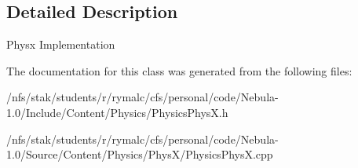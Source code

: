 \subsection{Detailed Description}
Physx Implementation 

The documentation for this class was generated from the following files:\begin{DoxyCompactItemize}
\item 
/nfs/stak/students/r/rymalc/cfs/personal/code/Nebula-\/1.0/Include/Content/Physics/PhysicsPhysX.h\item 
/nfs/stak/students/r/rymalc/cfs/personal/code/Nebula-\/1.0/Source/Content/Physics/PhysX/PhysicsPhysX.cpp\end{DoxyCompactItemize}
